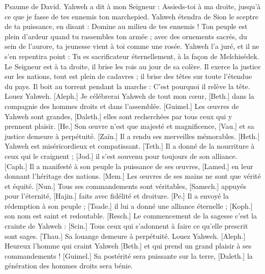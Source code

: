 \begin{multicols}{2}
\VerseOne{}Psaume de David. Yahweh a dit à mon Seigneur : Assieds-toi à ma droite, jusqu’à ce que je fasse de tes ennemis ton marchepied.
Yahweh étendra de Sion le sceptre de ta puissance, en disant : Domine au milieu de tes ennemis !
Ton peuple est plein d’ardeur quand tu rassembles ton armée ; avec des ornements sacrés, du sein de l’aurore, ta jeunesse vient à toi comme une rosée.
Yahweh l'a juré, et il ne s'en repentira point : Tu es sacrificateur éternellement, à la façon de Melchisédek.
Le Seigneur est à ta droite, il brise les rois au jour de sa colère.
Il exerce la justice sur les nations, tout est plein de cadavres ; il brise des têtes sur toute l’étendue du pays.
Il boit au torrent pendant la marche : C'est pourquoi il relève la tête.
\VerseOne{}Louez Yahweh. [Aleph.] Je célébrerai Yahweh de tout mon cœur, [Beth.] dans la compagnie des hommes droits et dans l'assemblée.
[Guimel.] Les œuvres de Yahweh sont grandes, [Daleth.] elles sont recherchées par tous ceux qui y prennent plaisir.
[He.] Son œuvre n'est que majesté et magnificence, [Vau.] et sa justice demeure à perpétuité.
[Zaïn.] Il a rendu ses merveilles mémorables. [Heth.] Yahweh est miséricordieux et compatissant.
[Teth.] Il a donné de la nourriture à ceux qui le craignent ; [Jod.] il s'est souvenu pour toujours de son alliance.
[Caph.] Il a manifesté à son peuple la puissance de ses œuvres, [Lamed.] en leur donnant l'héritage des nations.
[Mem.] Les œuvres de ses mains ne sont que vérité et équité. [Nun.] Tous ses commandements sont véritables,
[Samech.] appuyés pour l’éternité, [Hajin.] faits avec fidélité et droiture.
[Pe.] Il a envoyé la rédemption à son peuple ; [Tsade.] il lui a donné une alliance éternelle ; [Koph.] son nom est saint et redoutable.
[Resch.] Le commencement de la sagesse c'est la crainte de Yahweh : [Scin.] Tous ceux qui s'adonnent à faire ce qu'elle prescrit sont sages. [Thau.] Sa louange demeure à perpétuité.
\VerseOne{}Louez Yahweh. [Aleph.] Heureux l'homme qui craint Yahweh [Beth.] et qui prend un grand plaisir à ses commandements !
[Guimel.] Sa postérité sera puissante sur la terre, [Daleth.] la génération des hommes droits sera bénie.

\end{multicols}
